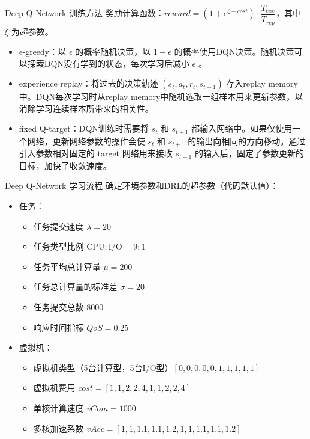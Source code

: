 \begin{frame}{Deep Q-Network 训练方法}
    奖励计算函数：$reward = (1 + e^{\xi - cost}) \cdot \dfrac{T_{exe}}{T_{rep}}$，其中 $\xi$ 为超参数。

    \begin{itemize}
        \item<2-> $\epsilon$-greedy：以 $\epsilon$ 的概率随机决策，以 $1-\epsilon$ 的概率使用DQN决策。随机决策可以探索DQN没有学到的状态，每次学习后减小 $\epsilon$ 。
        \item<3-> experience replay：将过去的决策轨迹 $(s_t, a_t, r_t, s_{t+1})$ 存入replay memory中。DQN每次学习时从replay memory中随机选取一组样本用来更新参数，以消除学习连续样本所带来的相关性。
        \item<4-> fixed Q-target：DQN训练时需要将 $s_t$ 和 $s_{t+1}$ 都输入网络中。如果仅使用一个网络，更新网络参数的操作会使 $s_t$ 和 $s_{t+1}$ 的输出向相同的方向移动。通过引入参数相对固定的 target 网络用来接收 $s_{t+1}$ 的输入后，固定了参数更新的目标，加快了收敛速度。
    \end{itemize}

\end{frame}

\begin{frame}{Deep Q-Network 学习流程}
    确定环境参数和DRL的超参数（代码默认值）：

    \begin{itemize}
        \item 任务：
              \begin{itemize}
                  \item 任务提交速度 $\lambda = 20$
                  \item 任务类型比例 $\text{CPU} : \text{I/O} = 9 : 1$
                  \item 任务平均总计算量 $\mu = 200$
                  \item 任务总计算量的标准差 $\sigma = 20$
                  \item 任务提交总数 $8000$
                  \item 响应时间指标 $QoS = 0.25$
              \end{itemize}
        \item 虚拟机：
              \begin{itemize}
                  \item 虚拟机类型（5台计算型，5台I/O型）$[0, 0, 0, 0, 0, 1, 1, 1, 1, 1]$
                  \item 虚拟机费用 $cost = [1, 1, 2, 2, 4, 1, 1, 2, 2, 4]$
                  \item 单核计算速度 $vCom = 1000$
                  \item 多核加速系数 $vAcc = [1, 1, 1.1, 1.1, 1.2, 1, 1, 1.1, 1.1, 1.2]$
              \end{itemize}
    \end{itemize}
\end{frame}

